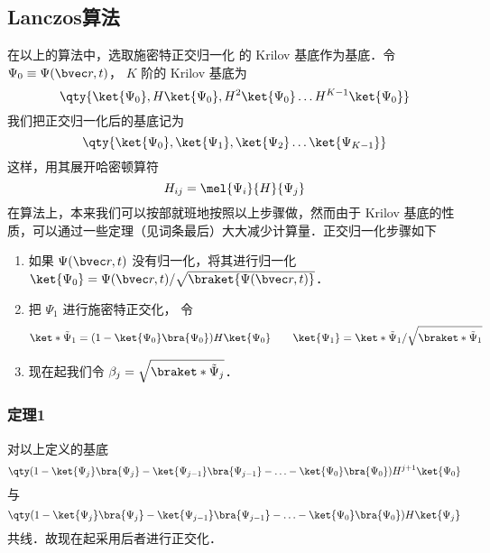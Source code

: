 \subsection{Lanczos算法}
在以上的算法中，选取施密特正交归一化 %
的 Krilov 基底作为基底．令 $\Psi_0 \equiv \Psi(\bvec r, t)$，  $K$ 阶的 Krilov 基底为
 \begin{equation}
\qty{ \ket{\Psi_0}, H \ket{\Psi_0}, H^2 \ket{\Psi_0} \dots H^{K-1} \ket{\Psi_0}}
\end{equation}
我们把正交归一化后的基底记为
\begin{equation}
\qty{ \ket{\Psi_0}, \ket{\Psi_1}, \ket{\Psi_2} \dots \ket{\Psi_{K-1}} }
\end{equation}
这样，用其展开哈密顿算符
\begin{equation}
H_{ij}=\mel{\Psi_i}{H}{\Psi_j}
\end{equation}
在算法上，本来我们可以按部就班地按照以上步骤做，然而由于 Krilov 基底的性质，可以通过一些定理（见词条最后）大大减少计算量．正交归一化步骤如下

\begin{enumerate}
\item 如果 $\Psi(\bvec r,t)$ 没有归一化，将其进行归一化 $\ket{\Psi_0}=\Psi(\bvec r,t)/\sqrt{\braket{\Psi(\bvec r,t)}}$．
\item 把 $\Psi_1$ 进行施密特正交化， 令
\begin{equation}
\ket*{\tilde\Psi_1} = (1 - \ket{\Psi_0}\bra{\Psi_0})H \ket{\Psi_0}
\qquad
\ket{\Psi_1}=\ket*{\tilde\Psi_1}/\sqrt{\braket*{\tilde\Psi_1}}
\end{equation}
\item 现在起我们令 $\beta_j = \sqrt{\braket*{\tilde\Psi_j}}$． %
\end{enumerate}

\subsubsection{定理1}
对以上定义的基底
\begin{equation}
\qty(1 - \ket{\Psi_j} \bra{\Psi_j} - \ket{\Psi_{j - 1}} \bra{\Psi_{j - 1}} - \ldots - \ket{\Psi_0} \bra{\Psi_0}) H^{j + 1} \ket{\Psi_0}
\end{equation}
与
\begin{equation}
\qty( 1 - \ket{\Psi_j}\bra{\Psi_j} - \ket{\Psi_{j - 1}}\bra{\Psi_{j - 1}} - \ldots - \ket{\Psi_0}\bra{\Psi_0}) H \ket{\Psi_j}
\end{equation}
共线．故现在起采用后者进行正交化．

